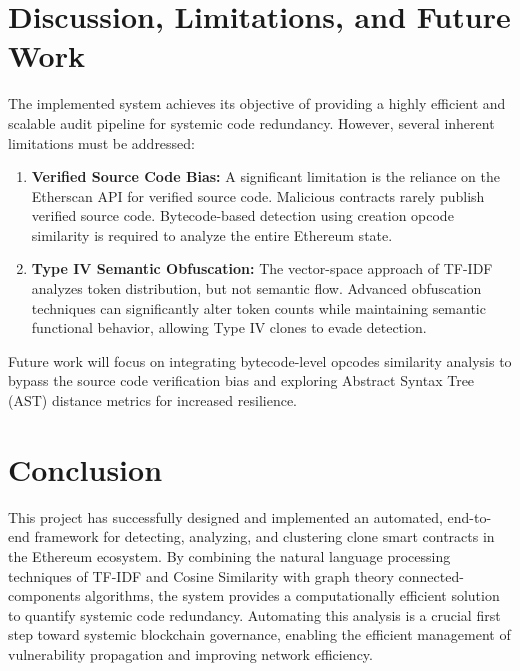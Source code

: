 \documentclass[12pt,a4paper]{article}
\begin{document}
\section{Discussion, Limitations, and Future Work}
The implemented system achieves its objective of providing a highly efficient and scalable audit pipeline for systemic code redundancy. However, several inherent limitations must be addressed:

\begin{enumerate}
    \item \textbf{Verified Source Code Bias:} A significant limitation is the reliance on the Etherscan API for verified source code. Malicious contracts rarely publish verified source code. Bytecode-based detection using creation opcode similarity is required to analyze the entire Ethereum state.
    \item \textbf{Type IV Semantic Obfuscation:} The vector-space approach of TF-IDF analyzes token distribution, but not semantic flow. Advanced obfuscation techniques can significantly alter token counts while maintaining semantic functional behavior, allowing Type IV clones to evade detection. 
\end{enumerate}

Future work will focus on integrating bytecode-level opcodes similarity analysis to bypass the source code verification bias and exploring Abstract Syntax Tree (AST) distance metrics for increased resilience.

\section{Conclusion}
This project has successfully designed and implemented an automated, end-to-end framework for detecting, analyzing, and clustering clone smart contracts in the Ethereum ecosystem. By combining the natural language processing techniques of TF-IDF and Cosine Similarity with graph theory connected-components algorithms, the system provides a computationally efficient solution to quantify systemic code redundancy. Automating this analysis is a crucial first step toward systemic blockchain governance, enabling the efficient management of vulnerability propagation and improving network efficiency.
\end{document}
